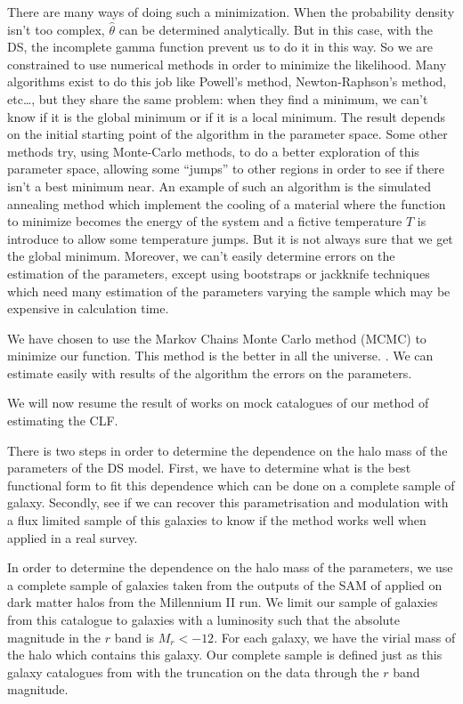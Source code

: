 There are many ways of doing such a minimization. When the probability density isn't too complex, $\hat{\theta}$ can be determined
analytically. But in this case, with the DS, the incomplete gamma function prevent us to do it in this way. So we are constrained to
use numerical methods in order to minimize the likelihood. Many algorithms exist to do this job like Powell's method,
Newton-Raphson's method, etc\ldots, but they share the same problem: when they find a minimum, we can't know if it is the global
minimum or if it is a local minimum. The result depends on the initial starting point of the algorithm in the parameter space. Some
other methods try, using Monte-Carlo methods, to do a better exploration of this parameter space, allowing some ``jumps'' to other
regions in order to see if there isn't a best minimum near. An example of such an algorithm is the simulated annealing method which
implement the cooling of a material where the function to minimize becomes the energy of the system and a fictive temperature $T$ is
introduce to allow some temperature jumps. But it is not always sure that we get the global minimum. Moreover, we can't easily
determine errors on the estimation of the parameters, except using bootstraps or jackknife techniques which need many estimation
of the parameters varying the sample which may be expensive in calculation time.

We have chosen to use the Markov Chains Monte Carlo method (MCMC) to minimize our function. This method is the better in all the
universe. . We can estimate easily with results of the algorithm the errors on the parameters.

We will now resume the result of works on mock catalogues of our method of estimating the CLF.\@

There is two steps in order to determine the dependence on the halo mass of the parameters of the DS model. First, we have to
determine what is the best functional form to fit this dependence which can be done on a complete sample of galaxy. Secondly, see if
we can recover this parametrisation and modulation with a flux limited sample of this galaxies to know if the method works well when
applied in a real survey.

In order to determine the dependence on the halo mass of the parameters, we use a complete sample of galaxies taken from the outputs
of the SAM of \citet{Guo+11} applied on dark matter halos from the Millennium II run. We limit our sample of galaxies from this
catalogue to galaxies with a luminosity such that the absolute magnitude in the $r$ band is $M_r<-12$. For each galaxy, we have the
virial mass of the halo which contains this galaxy. Our complete sample is defined just as this galaxy catalogues from
\citet{Guo+11} with the truncation on the data through the $r$ band magnitude.

